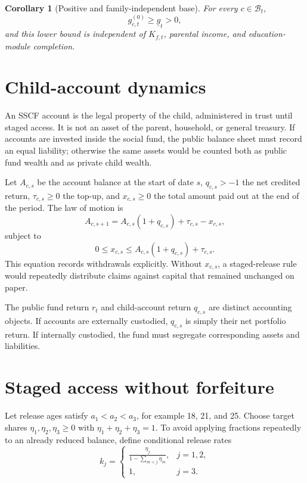 \documentclass[11pt]{article}
\newtheorem{corollary}[definition]{Corollary}
\begin{document}
\begin{corollary}[Positive and family-independent base]
For every $c\in\mathcal B_t$,
\begin{equation}
  g_{c,t}^{(0)}\ge\underline g_t>0,
\end{equation}
and this lower bound is independent of $K_{f,t}$, parental income, and education-module
completion.
\end{corollary}

\section{Child-account dynamics}

An SSCF account is the legal property of the child, administered in trust until staged
access. It is not an asset of the parent, household, or general treasury. If accounts
are invested inside the social fund, the public balance sheet must record an equal
liability; otherwise the same assets would be counted both as public fund wealth and as
private child wealth.

Let $A_{c,s}$ be the account balance at the start of date $s$, $q_{c,s}>-1$ the net
credited return, $\tau_{c,s}\ge0$ the top-up, and $x_{c,s}\ge0$ the total amount paid out
at the end of the period. The law of motion is
\begin{equation}\label{eq:accountlaw}
  A_{c,s+1}=A_{c,s}(1+q_{c,s})+\tau_{c,s}-x_{c,s},
\end{equation}
subject to
\begin{equation}
  0\le x_{c,s}\le A_{c,s}(1+q_{c,s})+\tau_{c,s}.
\end{equation}
This equation records withdrawals explicitly. Without $x_{c,s}$, a staged-release rule
would repeatedly distribute claims against capital that remained unchanged on paper.

The public fund return $r_t$ and child-account return $q_{c,s}$ are distinct accounting
objects. If accounts are externally custodied, $q_{c,s}$ is simply their net portfolio
return. If internally custodied, the fund must segregate corresponding assets and
liabilities.

\section{Staged access without forfeiture}

Let release ages satisfy $a_1<a_2<a_3$, for example 18, 21, and 25. Choose target
shares $\eta_1,\eta_2,\eta_3\ge0$ with $\eta_1+\eta_2+\eta_3=1$. To avoid applying
fractions repeatedly to an already reduced balance, define conditional release rates
\begin{equation}
  k_j=
  \begin{cases}
  \displaystyle\frac{\eta_j}{1-\sum_{m<j}\eta_m}, & j=1,2,\\[8pt]
  1, & j=3.
  \end{cases}
\end{equation}
\end{document}
